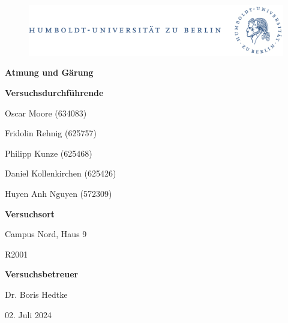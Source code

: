 \documentclass[10pt,a4paper]{article}
\begin{document}
	
	\begin{titlepage}
		\begin{center}
			\begin{figure}[h!tbp]
				\includegraphics[width=\linewidth]{HUlogo.PNG}
			\end{figure}
			\vspace*{2 cm}
			
			\textcolor{Bluetitle}{\textbf{\huge Atmung und Gärung}}\par
			
			\vspace*{2cm}
			
			\textcolor{Greyish}{\textbf{Versuchsdurchführende}}\par
			\textcolor{Greyish}{Oscar Moore (634083)}\par
			\textcolor{Greyish}{Fridolin Rehnig (625757)}\par
			\textcolor{Greyish}{Philipp Kunze (625468)}\par
			\textcolor{Greyish}{Daniel Kollenkirchen (625426)}\par
			\textcolor{Greyish}{Huyen Anh Nguyen (572309)}\par
			
			\vspace*{0.5cm}
			\textcolor{Greyish}{\textbf{Versuchsort}}\par
			\textcolor{Greyish}{Campus Nord, Haus 9}\par
			\textcolor{Greyish}{R2001}\par
			\vspace*{0.5cm}
			\textcolor{Greyish}{\textbf{Versuchsbetreuer}}\par
			\textcolor{Greyish}{Dr. Boris Hedtke}\par
			
			\vspace*{2 cm}
			
			\textcolor{Greyish}{02. Juli 2024}\par
			
			
			
			
		\end{center}
	\end{titlepage}
	
	\tableofcontents
	
\end{document}
